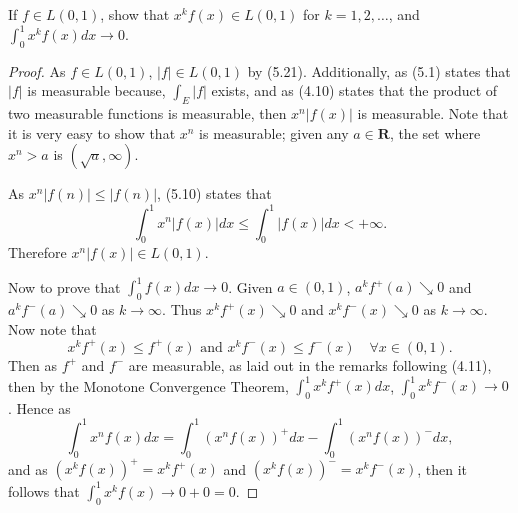 \documentclass[12pt]{book}
\newcommand{\R}{\mathbf{R}}
\newcommand{\tand}{\text{ and }}
\renewcommand{\.}{\mkern1mu}
\newcommand{\abs}[1]{\left| #1 \right|}
\newenvironment{pf}{\begin{proof}\setlength{\parindent}{\normalparindent}\setlength{\parskip}{\normalparskip}}{\end{proof}}
\theoremstyle{theorem}
\newlength{\normalparindent}
\newlength{\normalparskip}
\begin{document}
	\item If $f\in L(0,1)$, show that $x^kf(x) \in L(0,1)$ for $k = 1, 2, \ldots$, and $\int_0^1 x^k f(x)dx \to 0.$
	\begin{pf}
		As $f \in L(0,1)$, $\abs{f} \in L(0,1)$ by (5.21). Additionally, as (5.1) states that $\abs{f}$ is measurable because, $\int_E \abs{f}$ exists, and as (4.10) states that the product of two measurable functions is measurable, then $x^n\abs{f(x)}$ is measurable. Note that it is very easy to show that $x^n$ is measurable; given any $a\in\R$, the set where $x^n > a$ is $(\sqrt{a}, \infty)$.
		
		As $x^n\abs{f(n)} \leq \abs{f(n)}$, (5.10) states that 
			\[ \int_0^1 x^n\abs{f(x)}dx \leq \int_0^1 \abs{f(x)}dx < +\infty.\]
		Therefore $x^n\abs{f(x)} \in L(0,1)$.
		
		Now to prove that $\int_0^1 f(x)dx \to 0$. Given $a\in(0,1)$, $a^kf^+(a)\searrow 0$ and $a^kf^-(a)\searrow 0$ as $k\to \infty$. Thus $x^kf^+(x)\searrow 0$ and $x^kf^-(x) \searrow 0$ as $k\to\infty$. Now note that 
			\[ x^kf^+(x) \leq f^+(x) \tand x^kf^-(x) \leq f^-(x) \quad \forall x\in(0,1). \]
		Then as $f^+$ and $f^-$ are measurable, as laid out in the remarks following (4.11), then by the Monotone Convergence Theorem, $\int_0^1 x^kf^+(x) dx$, $\int_0^1 x^kf^-(x) \to 0$. Hence as 
			\[ \int_0^1 x^nf(x)dx = \int_0^1 (x^nf(x))^+dx - \int_0^1 (x^nf(x))^-dx, \]
		and as $(x^kf(x))^+ = x^k f^+(x)$ and $(x^kf(x))^- = x^kf^-(x)$, then it follows that $\int_0^1 x^kf(x) \to 0 + 0 = 0$.
	\end{pf}
	
\end{document}
